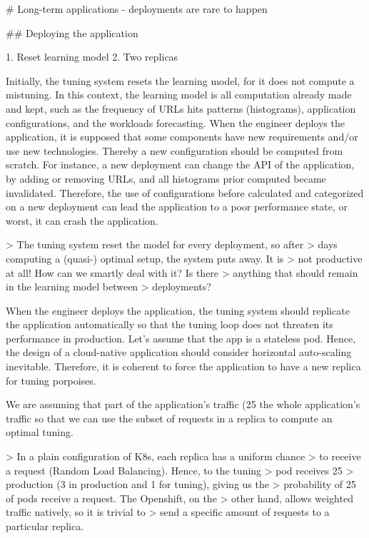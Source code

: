 # Long-term applications - deployments are rare to happen

## Deploying the application

1. Reset learning model
2. Two replicas

Initially, the tuning system resets the learning model, for it does not compute a mistuning. In this context, the
learning model is all computation already made and kept, such as the frequency of URLs hits patterns (histograms),
application configurations, and the workloads forecasting. When the engineer deploys the application, it is supposed
that some components have new requirements and/or use new technologies.  Thereby a new configuration should be computed
from scratch. For instance, a new deployment can change the API of the application, by adding or removing URLs, and all
histograms prior computed became invalidated. Therefore, the use of configurations before calculated and categorized on
a new deployment can lead the application to a poor performance state, or worst, it can crash the application.

> The tuning system reset the model for every deployment, so after
> days computing a (quasi-) optimal setup, the system puts away. It is
> not productive at all! How can we smartly deal with it? Is there
> anything that should remain in the learning model between
> deployments?

When the engineer deploys the application, the tuning system should
replicate the application automatically so that the tuning loop does
not threaten its performance in production. Let's assume that the app
is a stateless pod. Hence, the design of a cloud-native application
should consider horizontal auto-scaling inevitable. Therefore, it is
coherent to force the application to have a new replica for tuning
porpoises.

We are assuming that part of the application's traffic (25%
the whole application's traffic so that we can use the subset of
requests in a replica to compute an optimal tuning.

> In a plain configuration of K8s, each replica has a uniform chance
> to receive a request (Random Load Balancing). Hence, to the tuning
> pod receives 25%
> production (3 in production and 1 for tuning), giving us the
> probability of 25 of pods receive a request. The Openshift, on the
> other hand, allows weighted traffic natively, so it is trivial to
> send a specific amount of requests to a particular replica.

